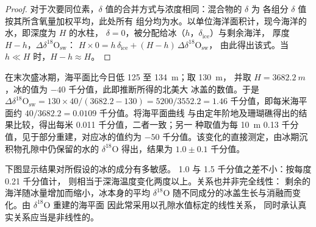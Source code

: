 \begin{proof}
对于次要同位素，$\delta$ 值的合并方式与浓度相同：混合物的 $\delta$ 为
各组分 $\delta$ 值按其所含氧量加权平均，此处所有
组分均为水。以单位海洋面积计，现今海洋的水，即深度为 $H$ 的水柱，
$\delta = 0$，被分配给冰（$h$，$\delta_{\mathrm{ice}}$）与剩余海洋，
厚度 $H - h$，$\Delta\delta^{18}\mathrm{O}_{\mathrm{sw}}$：
$H \times 0 = h\,\delta_{\mathrm{ice}} + (H - h)\,\Delta\delta^{18}\mathrm{O}_{\mathrm{sw}}$，
由此得出该式。当 $h \ll H$ 时，$H - h \approx H$。
\end{proof}

\begin{example}[末次冰期的海洋]\label{ex:b2:climate-proxies:lgm}
在末次盛冰期，海平面比今日低 125 至 \qty{134}{m}；取 \qty{130}{m}，
并取 $H = \qty{3682.2}{m}$，冰的值为 $-40$ 千分值，此即推断所得的北美大
冰盖的数值。于是
$\Delta\delta^{18}\mathrm{O}_{\mathrm{sw}} = 130 \times 40/(3682.2 - 130) = 5200/3552.2 = 1.46$
千分值，即每米海平面约 $40/3682.2 = 0.0109$ 千分值。将海平面曲线
与由定年阶地及珊瑚礁得出的结果比较，得出每米 \num{0.011} 千分值，二者一致；另一
种取值为每 \qty{10}{m} \num{0.13} 千分值，见于部分重建，对应冰的值约为
$-50$ 千分值。该变化的直接测定，由冰期沉积物孔隙中仍保留的水的
$\delta^{18}$O 得出，结果为 $1.0 \pm 0.1$ 千分值。
\end{example}

下图显示结果对所假设的冰的成分有多敏感。
\num{1.0} 与 \num{1.5} 千分值之差不小：按每度 \num{0.21} 千分值计，
则相当于深海温度变化两度以上。关系也并非完全线性：
剩余的海洋随冰量增加而缩小，冰本身的平均 $\delta^{18}$O
随不同成分的冰盖生长与消融而变化。由 $\delta^{18}$O 重建的海平面
因此常采用以孔隙水值标定的线性关系，
同时承认真实关系应当是非线性的。

